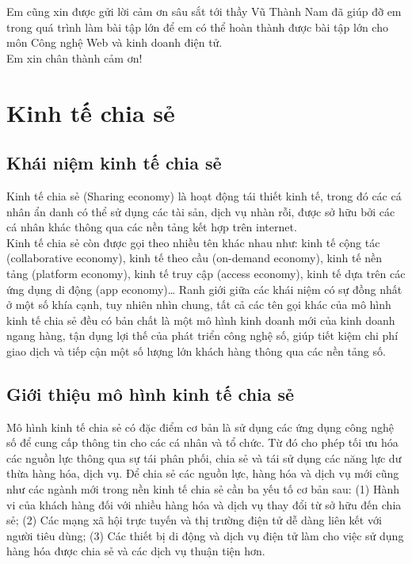 \documentclass[12pt,a4paper]{report}
\begin{document}
Em cũng xin được gửi lời cảm ơn sâu sắt tới thầy Vũ Thành Nam đã giúp đỡ em trong quá trình làm bài tập lớn để em có thể hoàn thành được bài tập lớn cho môn Công nghệ Web và kinh doanh điện tử.\\

Em xin chân thành cảm ơn!
\chapter{Kinh tế chia sẻ}
\section{Khái niệm kinh tế chia sẻ}
Kinh tế chia sẻ (Sharing economy) là hoạt động tái thiết kinh tế, trong đó các cá nhân ẩn danh có thể sử dụng các tài sản, dịch vụ nhàn rỗi, được sở hữu bởi các cá nhân khác thông qua các nền tảng kết hợp trên internet.\\

Kinh tế chia sẻ còn được gọi theo nhiều tên khác nhau như: kinh tế cộng tác (collaborative economy), kinh tế theo cầu (on-demand economy), kinh tế nền tảng (platform economy), kinh tế truy cập (access economy), kinh tế dựa trên các ứng dụng di động (app economy)… Ranh giới giữa các khái niệm có sự đồng nhất ở một số khía cạnh, tuy nhiên nhìn chung, tất cả các tên gọi khác của mô hình kinh tế chia sẻ đều có bản chất là một mô hình kinh doanh mới của kinh doanh ngang hàng, tận dụng lợi thế của phát triển công nghệ số, giúp tiết kiệm chi phí giao dịch và tiếp cận một số lượng lớn khách hàng thông qua các nền tảng số.\\

\section{Giới thiệu mô hình kinh tế chia sẻ}
Mô hình kinh tế chia sẻ có đặc điểm cơ bản là sử dụng các ứng dụng công nghệ số để cung cấp thông tin cho các cá nhân và tổ chức. Từ đó cho phép tối ưu hóa các nguồn lực thông qua sự tái phân phối, chia sẻ và tái sử dụng các năng lực dư thừa hàng hóa, dịch vụ. Để chia sẻ các nguồn lực, hàng hóa và dịch vụ mới cũng như các ngành mới trong nền kinh tế chia sẻ cần ba yếu tố cơ bản sau: (1) Hành vi của khách hàng đối với nhiều hàng hóa và dịch vụ thay đổi từ sở hữu đến chia
sẻ; (2) Các mạng xã hội trực tuyến và thị trường điện tử dễ
dàng liên kết với người tiêu dùng; (3) Các thiết bị di động và dịch vụ điện tử làm cho việc sử dụng hàng hóa được chia sẻ và các dịch vụ thuận tiện hơn.\\
\end{document}
